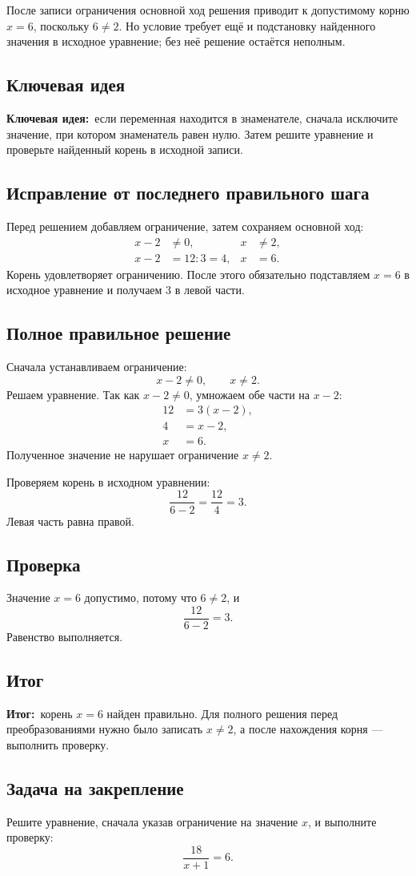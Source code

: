 \documentclass[a4paper,12pt]{article}
\newcommand{\KeyIdea}{\textcolor{Accent}{\textbf{Ключевая идея:}}}
\newcommand{\Outcome}{\textcolor{Result}{\textbf{Итог:}}}
\begin{document}
После записи ограничения основной ход решения приводит к допустимому корню $x=6$, поскольку $6\ne2$. Но условие требует ещё и подстановку найденного значения в исходное уравнение; без неё решение остаётся неполным.

\subsection*{Ключевая идея}
\KeyIdea\ если переменная находится в знаменателе, сначала исключите значение, при котором знаменатель равен нулю. Затем решите уравнение и проверьте найденный корень в исходной записи.

\subsection*{Исправление от последнего правильного шага}
Перед решением добавляем ограничение, затем сохраняем основной ход:
\[
\begin{aligned}
x-2&\ne0, & x&\ne2,\\
x-2&=12:3=4, & x&=6.
\end{aligned}
\]
Корень удовлетворяет ограничению. После этого обязательно подставляем $x=6$ в исходное уравнение и получаем $3$ в левой части.

\subsection*{Полное правильное решение}
Сначала устанавливаем ограничение:
\[
x-2\ne0,
\qquad
x\ne2.
\]
Решаем уравнение. Так как $x-2\ne0$, умножаем обе части на $x-2$:
\[
\begin{aligned}
12&=3(x-2),\\
4&=x-2,\\
x&=6.
\end{aligned}
\]
Полученное значение не нарушает ограничение $x\ne2$.

Проверяем корень в исходном уравнении:
\[
\frac{12}{6-2}=\frac{12}{4}=3.
\]
Левая часть равна правой.

\subsection*{Проверка}
Значение $x=6$ допустимо, потому что $6\ne2$, и
\[
\frac{12}{6-2}=3.
\]
Равенство выполняется.

\subsection*{Итог}
\Outcome\ корень $x=6$ найден правильно. Для полного решения перед преобразованиями нужно было записать $x\ne2$, а после нахождения корня --- выполнить проверку.

\subsection*{Задача на закрепление}
Решите уравнение, сначала указав ограничение на значение $x$, и выполните проверку:
\[
\frac{18}{x+1}=6.
\]
\end{document}
